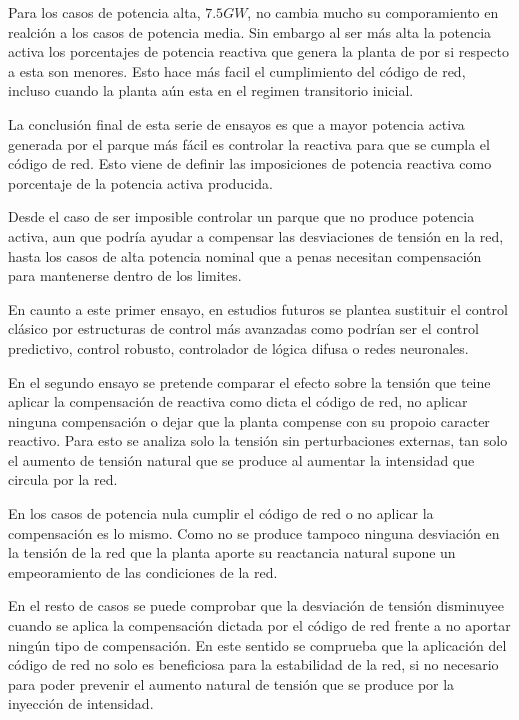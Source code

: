 \documentclass{book}
\begin{document}
Para los casos de potencia alta, $7.5 GW$, no cambia mucho su comporamiento en realci\'on a los casos de potencia media. Sin embargo al ser m\'as alta la potencia activa los porcentajes de potencia reactiva que genera la planta de por si respecto a esta son menores. Esto hace m\'as facil el cumplimiento del c\'odigo de red, incluso cuando la planta a\'un esta en el regimen transitorio inicial. \par

La conclusi\'on final de esta serie de ensayos es que a mayor potencia activa generada por el parque m\'as f\'acil es controlar la reactiva para que se cumpla el c\'odigo de red. Esto viene de definir las imposiciones de potencia reactiva como porcentaje de la potencia activa producida. \par

Desde el caso de ser imposible controlar un parque que no produce potencia activa, aun que podr\'ia ayudar a compensar las desviaciones de tensi\'on en la red, hasta los casos de alta potencia nominal que a penas necesitan compensaci\'on para mantenerse dentro de los limites. \par

En caunto a este primer ensayo, en estudios futuros se plantea sustituir el control cl\'asico por estructuras de control m\'as avanzadas como podr\'ian ser el control predictivo, control robusto, controlador de l\'ogica difusa o redes neuronales. \par

En el segundo ensayo se pretende comparar el efecto sobre la tensi\'on que teine aplicar la compensaci\'on de reactiva como dicta el c\'odigo de red, no aplicar ninguna compensaci\'on o dejar que la planta compense con su propoio caracter reactivo. Para esto se analiza solo la tensi\'on sin perturbaciones externas, tan solo el aumento de tensi\'on natural que se produce al aumentar la intensidad que circula por la red. \par

En los casos de potencia nula cumplir el c\'odigo de red o no aplicar la compensaci\'on es lo mismo. Como no se produce tampoco ninguna desviaci\'on en la tensi\'on de la red que la planta aporte su reactancia natural supone un empeoramiento de las condiciones de la red. \par

En el resto de casos se puede comprobar que la desviaci\'on de tensi\'on disminuyee cuando se aplica la compensaci\'on dictada por el c\'odigo de red frente a no aportar ning\'un tipo de compensaci\'on. En este sentido se comprueba que la aplicaci\'on del c\'odigo de red no solo es beneficiosa para la estabilidad de la red, si no necesario para poder prevenir el aumento natural de tensi\'on que se produce por la inyecci\'on de intensidad. \par
\end{document}
